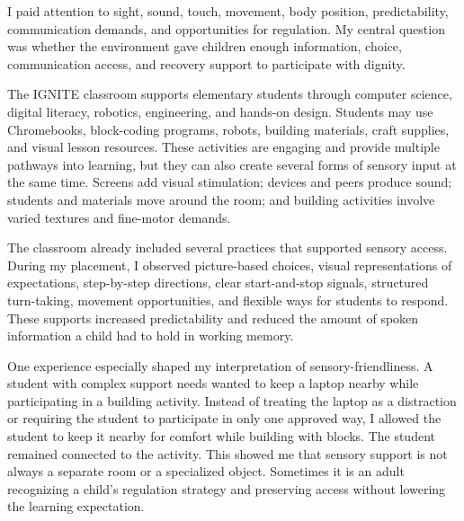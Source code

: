 \documentclass[11pt]{article}
\newcommand{\reviewsection}[1]{\vspace{0.07in}\noindent{\normalsize\bfseries\color{PrimaryRed}#1}\par\vspace{0.02in}}
\begin{document}
I paid attention to sight, sound, touch, movement, body position, predictability, communication demands, and opportunities for regulation. My central question was whether the environment gave children enough information, choice, communication access, and recovery support to participate with dignity.

\reviewsection{Summary of the Experience}

The IGNITE classroom supports elementary students through computer science, digital literacy, robotics, engineering, and hands-on design. Students may use Chromebooks, block-coding programs, robots, building materials, craft supplies, and visual lesson resources. These activities are engaging and provide multiple pathways into learning, but they can also create several forms of sensory input at the same time. Screens add visual stimulation; devices and peers produce sound; students and materials move around the room; and building activities involve varied textures and fine-motor demands.

The classroom already included several practices that supported sensory access. During my placement, I observed picture-based choices, visual representations of expectations, step-by-step directions, clear start-and-stop signals, structured turn-taking, movement opportunities, and flexible ways for students to respond. These supports increased predictability and reduced the amount of spoken information a child had to hold in working memory.

One experience especially shaped my interpretation of sensory-friendliness. A student with complex support needs wanted to keep a laptop nearby while participating in a building activity. Instead of treating the laptop as a distraction or requiring the student to participate in only one approved way, I allowed the student to keep it nearby for comfort while building with blocks. The student remained connected to the activity. This showed me that sensory support is not always a separate room or a specialized object. Sometimes it is an adult recognizing a child's regulation strategy and preserving access without lowering the learning expectation.

\newpage
\reviewsection{Sensory Evidence}
\end{document}
